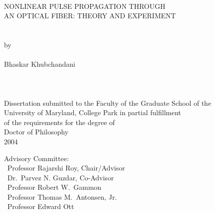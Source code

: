
\thispagestyle{empty} \hbox{\ } \vspace{1.5in}
\renewcommand{\baselinestretch}{1}
\small\normalsize
\begin{center}

\large{{NONLINEAR PULSE PROPAGATION THROUGH \\
AN OPTICAL FIBER: THEORY AND EXPERIMENT}}\\
\ \\
\ \\
\large{by} \\
\ \\
\large{Bhaskar Khubchandani}%
\ \\
\ \\
\ \\
\ \\
\normalsize
Dissertation submitted to the Faculty of the Graduate School of the \\
University of Maryland, College Park in partial fulfillment \\
of the requirements for the degree of \\
Doctor of Philosophy \\
2004
\end{center}

\vspace{7.5em}

\noindent Advisory Committee: \\
\hbox{\ }\hspace{.5in}Professor Rajarshi Roy, Chair/Advisor \\
\hbox{\ }\hspace{.5in}Dr.\ Parvez N. Guzdar, Co-Advisor \\
\hbox{\ }\hspace{.5in}Professor Robert W.\ Gammon \\
\hbox{\ }\hspace{.5in}Professor Thomas M.\ Antonsen, Jr.\ \\
\hbox{\ }\hspace{.5in}Professor Edward Ott
